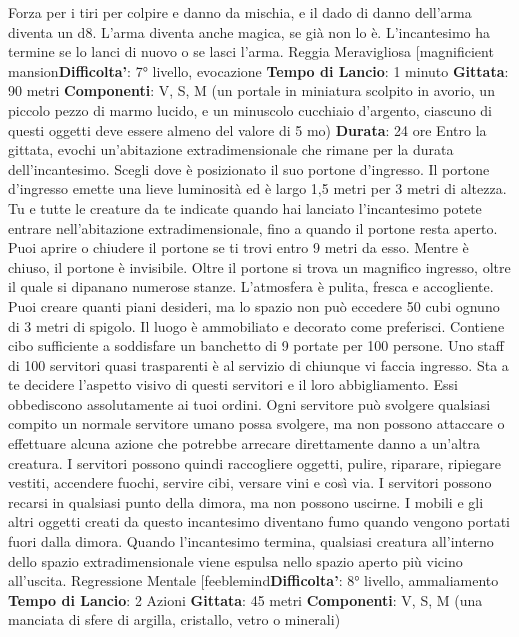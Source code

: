 \begin{multicols}{2}
Forza per i tiri per colpire e danno da mischia, e il dado
di danno dell’arma diventa un d8. L’arma diventa anche
magica, se già non lo è. L’incantesimo ha termine se lo
lanci di nuovo o se lasci l’arma.
Reggia Meravigliosa
[magnificient mansion\textbf{Difficolta'}:
7° livello, evocazione
\textbf{Tempo di Lancio}: 1 minuto
\textbf{Gittata}: 90 metri
\textbf{Componenti}: V, S, M (un portale in miniatura scolpito
in avorio, un piccolo pezzo di marmo lucido, e un
minuscolo cucchiaio d’argento, ciascuno di questi
oggetti deve essere almeno del valore di 5 mo)
\textbf{Durata}: 24 ore
Entro la gittata, evochi un’abitazione extradimensionale
che rimane per la durata dell’incantesimo. Scegli dove è
posizionato il suo portone d’ingresso. Il portone
d’ingresso emette una lieve luminosità ed è largo 1,5
metri per 3 metri di altezza. Tu e tutte le creature da te
indicate quando hai lanciato l’incantesimo potete
entrare nell’abitazione extradimensionale, fino a quando
il portone resta aperto. Puoi aprire o chiudere il portone
se ti trovi entro 9 metri da esso. Mentre è chiuso, il
portone è invisibile.
Oltre il portone si trova un magnifico ingresso, oltre il
quale si dipanano numerose stanze. L’atmosfera è
pulita, fresca e accogliente.
Puoi creare quanti piani desideri, ma lo spazio non può
eccedere 50 cubi ognuno di 3 metri di spigolo. Il luogo è
ammobiliato e decorato come preferisci. Contiene cibo
sufficiente a soddisfare un banchetto di 9 portate per
100 persone. Uno staff di 100 servitori quasi trasparenti
è al servizio di chiunque vi faccia ingresso. Sta a te
decidere l’aspetto visivo di questi servitori e il loro
abbigliamento. Essi obbediscono assolutamente ai tuoi
ordini. Ogni servitore può svolgere qualsiasi compito un
normale servitore umano possa svolgere, ma non
possono attaccare o effettuare alcuna azione che
potrebbe arrecare direttamente danno a un’altra
creatura. I servitori possono quindi raccogliere oggetti,
pulire, riparare, ripiegare vestiti, accendere fuochi,
servire cibi, versare vini e così via. I servitori possono
recarsi in qualsiasi punto della dimora, ma non possono
uscirne. I mobili e gli altri oggetti creati da questo
incantesimo diventano fumo quando vengono portati
fuori dalla dimora. Quando l’incantesimo termina,
qualsiasi creatura all’interno dello spazio
extradimensionale viene espulsa nello spazio aperto più
vicino all’uscita.
Regressione Mentale
[feeblemind\textbf{Difficolta'}:
8° livello, ammaliamento
\textbf{Tempo di Lancio}: 2 Azioni
\textbf{Gittata}: 45 metri
\textbf{Componenti}: V, S, M (una manciata di sfere di argilla,
cristallo, vetro o minerali)

\end{multicols}
